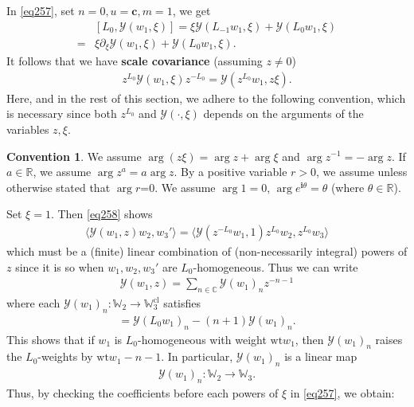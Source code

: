 \documentclass[12pt,a4paper,notitlepage]{article}
\theoremstyle{definition}
\newtheorem{cv}[df]{Convention}
\theoremstyle{plain}
\newcommand{\mc}{\mathcal}
\newcommand{\bk}[1]{\langle {#1}\rangle}
\newcommand{\im}{\mathbf{i}}
\newcommand{\Wbb}{\mathbb W}
\newcommand{\Cbb}{\mathbb C}
\newcommand{\Rbb}{\mathbb R}
\newcommand{\cbf}{\mathbf c}
\newcommand{\wt}{\mathrm{wt}}
\newcommand{\cl}{\mathrm{cl}}
\numberwithin{equation}{section}
\begin{document}
In \eqref{eq257}, set $n=0,u=\cbf,m=1$, we get
\begin{align*}
&[L_0,\mc Y(w_1,\xi)]=\xi\mc Y(L_{-1}w_1,\xi)+\mc Y(L_0w_1,\xi)\\
=&\xi\partial_\xi \mc Y(w_1,\xi)+\mc Y(L_0w_1,\xi).
\end{align*}
It follows that we have \textbf{scale covariance} (assuming $ z\neq 0$)
\begin{align}
 z^{L_0}\mc Y(w_1,\xi) z^{-L_0}=\mc Y( z^{L_0}w_1, z\xi).\label{eq258}
\end{align}
Here, and in the rest of this section, we adhere to the following convention, which is necessary since both $ z^{L_0}$ and $\mc Y(\cdot,\xi)$ depends on the arguments of the variables $ z,\xi$.
\begin{cv}\label{lb183}
We assume $\arg( z\xi)=\arg z+\arg\xi$ and $\arg z^{-1}=-\arg z$. If $a\in\Rbb$, we assume $\arg z^a=a\arg z$. By a positive variable $r>0$, we assume unless otherwise stated that $\arg r$=0. We assume $\arg 1=0$, $\arg e^{\im\theta}=\theta$ (where $\theta\in\Rbb$).
\end{cv}
Set $\xi=1$. Then \eqref{eq258} shows
\begin{align}
\bk{\mc Y(w_1,z)w_2,w_3'}=\bk{\mc Y(z^{-L_0}w_1,1)z^{L_0}w_2,z^{L_0}w_3}
\end{align}
which must be a (finite) linear combination of (non-necessarily integral) powers of $z$ since it is so when $w_1,w_2,w_3'$ are $L_0$-homogeneous. Thus we can write
\begin{align*}
\mc Y(w_1,z)=\sum_{n\in\Cbb}\mc Y(w_1)_nz^{-n-1}
\end{align*}
where each $\mc Y(w_1)_n:\Wbb_2\rightarrow\Wbb_3^\cl$ satisfies
\begin{align}
[L_0,\mc Y(w_1)_n]=\mc Y(L_0w_1)_n-(n+1)\mc Y(w_1)_n.
\end{align}
This shows that if $w_1$ is $L_0$-homogeneous with weight $\wt w_1$, then $\mc Y(w_1)_n$ raises the $L_0$-weights by $\wt w_1-n-1$. In particular, $\mc Y(w_1)_n$ is a linear map
\begin{align*}
\mc Y(w_1)_n:\Wbb_2\rightarrow\Wbb_3.
\end{align*}
Thus, by checking the coefficients before each powers of $\xi$ in \eqref{eq257}, we obtain:
\end{document}
